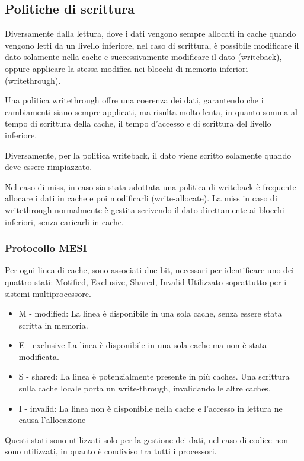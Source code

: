 \documentclass[../template]{subfiles}
\begin{document}
\subsection{Politiche di scrittura}
Diversamente dalla lettura, dove i dati vengono sempre allocati in cache quando vengono letti da un livello inferiore, nel caso di scrittura, è possibile modificare il dato solamente nella cache e successivamente modificare il dato (writeback),  oppure applicare la stessa modifica nei blocchi di memoria inferiori (writethrough).

Una politica writethrough offre una coerenza dei dati, garantendo che i cambiamenti siano sempre applicati, ma risulta molto lenta, in quanto somma al tempo di scrittura della cache, il tempo d'accesso e di scrittura del livello inferiore.

Diversamente, per la politica writeback, il dato viene scritto solamente quando deve essere rimpiazzato.

Nel caso di miss, in caso sia stata adottata una politica di writeback è frequente allocare i dati in cache e poi modificarli (write-allocate). La miss in caso di writethrough normalmente è gestita scrivendo il dato direttamente ai blocchi inferiori, senza caricarli in cache.

\subsubsection{Protocollo MESI}
Per ogni linea di cache, sono associati due bit, necessari per identificare uno dei quattro stati: Motified, Exclusive, Shared, Invalid
Utilizzato soprattutto per i sistemi multiprocessore.
\begin{itemize}
    \item M - modified:
        La linea è disponibile in una sola cache, senza essere stata scritta in memoria.
    \item E - exclusive
        La linea è disponibile in una sola cache ma non è stata modificata.
    \item S - shared:
        La linea è potenzialmente presente in più caches. Una scrittura sulla cache locale porta un write-through, invalidando le altre caches.
    \item I - invalid:
        La linea non è disponibile nella cache e l'accesso in lettura ne causa l'allocazione
\end{itemize}

Questi stati sono utilizzati solo per la gestione dei dati, nel caso di codice non sono utilizzati, in quanto è condiviso tra tutti i processori.
\end{document}
